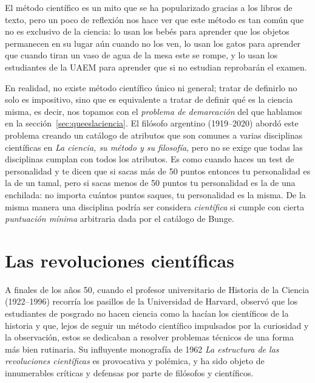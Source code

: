 El método científico es un mito que se ha popularizado gracias a los libros de
texto, pero un poco de reflexión nos hace ver que este método es tan común que
no es exclusivo de la ciencia: lo usan los bebés para aprender que los objetos
permanecen en su lugar aún cuando no los ven, lo usan los gatos para aprender
que cuando tiran un vaso de agua de la mesa este se rompe, y lo usan los
estudiantes de la UAEM para aprender que si no estudian reprobarán el examen.

En realidad, no existe método científico único ni general; tratar de definirlo
no solo es impositivo, sino que es equivalente a tratar de definir qué es la
ciencia misma, es decir, nos topamos con el \emph{problema de demarcación} del
que hablamos en la sección~\ref{sec:queeslaciencia}.
El filósofo argentino  (1919--2020) abordó este
problema creando un catálogo de atributos que son comunes a varias disciplinas
científicas en \emph{La ciencia, su método y su filosofía}\cite{Bunge1996}, pero
no se exige que todas las disciplinas cumplan con todos los atributos.
Es como cuando haces un test de personalidad y te dicen que si sacas más de 50
puntos entonces tu personalidad es la de un tamal, pero si sacas menos de 50
puntos tu personalidad es la de una enchilada: no importa cuántos puntos saques,
tu personalidad es la misma.
De la misma manera una disciplina podría ser considera \emph{científica} si
cumple con cierta \emph{puntuación mínima} arbitraria dada por el catálogo de
Bunge.

\section{Las revoluciones científicas}
\label{sec:lasrevolucionescientificas}
A finales de los años 50, cuando el profesor universitario de Historia de la
Ciencia  (1922--1996) recorría los pasillos de
la Universidad de Harvard, observó que los estudiantes de posgrado no hacen
ciencia como la hacían los científicos de la historia y que, lejos de seguir un
método científico impulsados por la curiosidad y la observación, estos se
dedicaban a resolver problemas técnicos de una forma más bien rutinaria.
Su influyente monografía de 1962 \emph{La estructura de las revoluciones %
    científicas}\cite{Kuhn2005} es provocativa y polémica, y ha sido objeto de
innumerables críticas y defensas por parte de filósofos y científicos.

